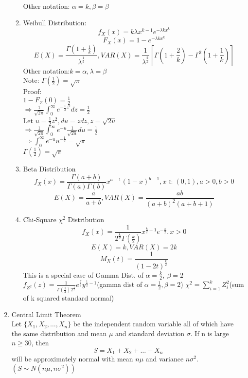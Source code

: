 \documentclass[10pt]{article}
\begin{document}
\begin{multicols}{2}
\begin{enumerate}
\begin{enumerate}
				Other notation: $\alpha = k, \beta = \beta$
				\item Weibull Distribution:\\
				$$f_X(x) = k\lambda x^{k-1}e^{-\lambda kx^k}$$
				$$F_X(x) = 1 - e^{-\lambda kx^k}$$
				$$E(X) = \frac{\Gamma(1+\frac{1}{k})}{\lambda^{\frac{1}{k}}}, VAR(X) = \frac{1}{\lambda^{\frac{2}{k}}}[\Gamma(1+\frac{2}{k}) - \Gamma^2(1+\frac{1}{k})]$$
				Other notation:$k = \alpha, \lambda = \beta$\\
				Note: $\Gamma(\frac{1}{2}) = \sqrt{\pi}$\\
				Proof:\\
				$1 - F_Z(0) = \frac{1}{2}$\\
				$\Rightarrow \frac{1}{\sqrt{2\pi}}\int_{0}^{\infty}e^{-\frac{1}{2}z^2}dz = \frac{1}{2}$\\
				Let $u = \frac{1}{2}z^2, du = zdz, z = \sqrt{2u}$\\
				$\Rightarrow \frac{1}{\sqrt{2\pi}}\int_{0}^{\infty}e^{-u}\frac{1}{\sqrt{2u}}du = \frac{1}{2}$\\
				$\Rightarrow \int_{0}^{\infty}e^{-u}u^{-\frac{1}{2}} = \sqrt{\pi}$\\
				$\Gamma(\frac{1}{2}) = \sqrt{\pi}$
				\item Beta Distribution
				$$f_X(x) = \frac{\Gamma(a + b)}{\Gamma(a)\Gamma(b)}x^{a-1}(1-x)^{b-1}, x \in (0,1), a>0, b>0$$
				$$E(X) = \frac{a}{a+b}, VAR(X) = \frac{ab}{(a+b)^2(a+b+1)}$$
				\item Chi-Square $\chi^2$ Distribution
				$$f_X(x) = \frac{1}{2^{\frac{k}{2}}\Gamma(\frac{k}{2})}x^{\frac{k}{2}-1}e^{-\frac{x}{2}}, x > 0$$
				$$E(X) = k, VAR(X) = 2k$$
				$$M_X(t) = \frac{1}{(1-2t)^{\frac{k}{2}}}$$
				This is a special case of Gamma Dist. of $\alpha = \frac{k}{2}, \ \beta = 2$\\
				$f_{Z^2}(z) = \frac{1}{\Gamma(\frac{1}{2})2^{\frac{1}{2}}}e^{\frac{y}{2}}y^{\frac{1}{2}-1}$(gamma dist of $\alpha = \frac{1}{2}, \beta = 2$)
				$\chi^2 = \sum_{i = 1}^{k}Z_i^2$(sum of k squared standard normal)
			\end{enumerate}
			\item Central Limit Theorem\\
			Let $\{ X_1, X_2, \dots, X_n \}$ be the independent random variable all of which have the same distribution and mean $\mu$ and standard deviation $\sigma$. If n is large $n \ge 30$, then 
			$$ S = X_1 + X_2 + \dots + X_n$$
			will be approximately normal with mean $n\mu$ and variance $n\sigma^2$. $(S\sim N(n\mu, n\sigma^2))$\\

\end{enumerate}
\end{multicols}
\end{document}
